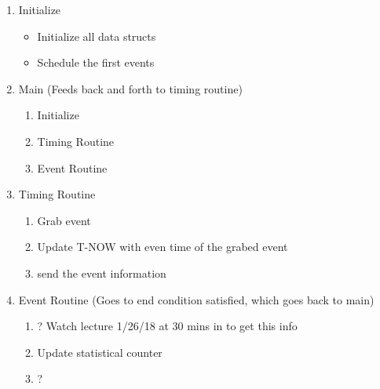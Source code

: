 \documentclass[12pt]{article}
\begin{document}
\begin{enumerate}
\item Initialize
\begin{itemize}
\item Initialize all data structs
\item Schedule the first events
\end{itemize}
\item Main (Feeds back and forth to timing routine)
\begin{enumerate}
\item Initialize
\item Timing Routine
\item Event Routine
\end{enumerate}
\item Timing Routine
\begin{enumerate}
\item Grab event
\item Update T-NOW with even time of the grabed event
\item send the event information
\end{enumerate}
\item Event Routine (Goes to end condition satisfied, which goes back to main)
\begin{enumerate}
\item ? Watch lecture 1/26/18 at 30 mins in to get this info
\item Update statistical counter 
\item ?
\end{enumerate}
\end{enumerate}
\end{document}
